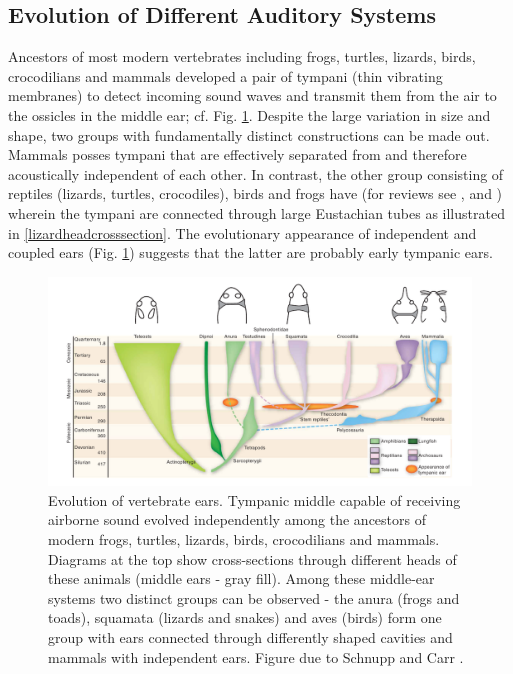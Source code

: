 \subsection{Evolution of Different Auditory Systems}\label{auditoryevolution}
Ancestors of most modern vertebrates including frogs, turtles, lizards, birds, crocodilians and mammals
developed a pair of tympani (thin vibrating membranes) to detect incoming sound waves and transmit
them from the air to the ossicles in the middle ear; cf. Fig. \ref{vertebrateearevolution}. 
Despite the large variation in size and shape, two groups with fundamentally distinct constructions can be
made out. Mammals posses tympani that are effectively separated from and therefore acoustically 
independent of each other. In contrast, the other group consisting of reptiles (lizards, turtles, crocodiles), birds and frogs
have  (for reviews see \cite{carrsoares}, \cite{dalsgaardcarr} and \cite{schnuppcarr}) wherein
the tympani are connected through large Eustachian tubes as illustrated in \ref{lizardheadcrosssection}. The evolutionary 
appearance of independent and coupled ears (Fig. \ref{vertebrateearevolution}) suggests that the latter are probably early
tympanic ears.
\begin{figure}[ht!]
 \includegraphics[width=1.0\linewidth]{Diagrams/vertebrateearevolution.png}
 \caption[Vertebrate Ear Evolution]{Evolution of vertebrate ears. Tympanic
 middle capable of receiving airborne sound evolved independently among the ancestors of modern frogs, turtles, lizards, birds,
 crocodilians and mammals. Diagrams at the top show cross-sections through different heads of these animals (middle ears - gray fill).
 Among these middle-ear systems two distinct groups can be observed - the anura (frogs and toads), squamata (lizards and snakes)
 and aves (birds) form one group with ears connected through differently shaped cavities and mammals with independent ears. Figure due to Schnupp and Carr \cite{schnuppcarr}.}
 \label{vertebrateearevolution}
\end{figure}

